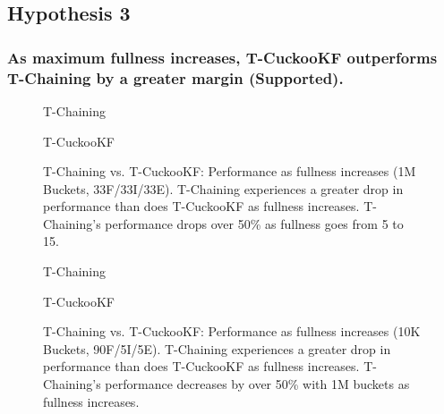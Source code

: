 \vspace{12pt}
\noindent{}

\subsection{Hypothesis 3}
\subsubsection{As maximum fullness increases, T-CuckooKF outperforms T-Chaining by a greater margin (Supported).}

\begin{figure}[ht!]
    \centering
    \begin{minipage}{0.7\textwidth}
    \caption*{T-Chaining}
        \vspace{12pt}
    \end{minipage}
    \begin{minipage}{0.7\textwidth}
    \caption*{T-CuckooKF}
    \end{minipage}
    \caption[T-Chaining vs. T-CuckooKF: Performance as fullness increases (1M Buckets, 33F/33I/33E)]{T-Chaining vs. T-CuckooKF: Performance as fullness increases (1M Buckets, 33F/33I/33E). T-Chaining experiences a greater drop in performance than does T-CuckooKF as fullness increases. T-Chaining's performance drops over 50\% as fullness goes from 5 to 15.}
    \label{fig:hm_fullness_33_2}
\end{figure}

\begin{figure}[ht!]
    \centering
    \begin{minipage}{0.70\textwidth}
    \caption*{T-Chaining}
        \vspace{12pt}
    \end{minipage}
    \begin{minipage}{0.70\textwidth}
    \caption*{T-CuckooKF}
    \end{minipage}
    \caption[T-Chaining vs. T-CuckooKF: Performance as fullness increases (1M Buckets, 90F/5I/5E)]{T-Chaining vs. T-CuckooKF: Performance as fullness increases (10K Buckets, 90F/5I/5E). T-Chaining experiences a greater drop in performance than does T-CuckooKF as fullness increases. T-Chaining's performance decreases by over 50\% with 1M buckets as fullness increases.}
    \label{fig:hm_fullness_90_2}
\end{figure}

